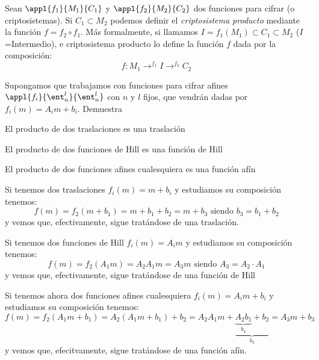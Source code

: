 \begin{problem}[10]
Sean $\appl{f_1}{M_1}{C_1}$ y $\appl{f_2}{M_2}{C_2}$ dos funciones para cifrar (o criptosistemas). Si $C_1 \subset M_2$ podemos definir el \textit{criptosistema producto} mediante la función $f = f_2 \circ f_1$. Más formalmente, si llamamos $I=f_1(M_1)\subset C_1 \subset M_2$ ($I$=Intermedio), e criptosistema producto lo define la función $f$ dada por la composición:
\[f:M_1 \to^{f_1} I \to^{f_2}C_2\]

Supongamos que trabajamos con funciones para cifrar afines $\appl{f_i}{\ent_n^l}{\ent_n^l}$ con $n$ y $l$ fijos, que vendrán dadas por $f_i(m)=A_im+b_i$. Demuestra

\ppart
El producto de dos traslaciones es una traslación

\ppart
El producto de dos funciones de Hill es una función de Hill

\ppart
El producto de dos funciones afines cualesquiera es una función afín

\solution
{}

\spart
Si tenemos dos traslaciones $f_i(m)=m+b_i$ y estudiamos su composición tenemos:
\[f(m)=f_2(m+b_1) = m+b_1+b_2 = m + b_3 \text{ siendo } b_3 = b_1+b_2\]
y vemos que, efectivamente, sigue tratándose de una traslación.

\spart
Si tenemos dos funciones de Hill $f_i(m)=A_im$ y estudiamos su composición tenemos:
\[f(m)=f_2(A_1m)=A_2A_1m = A_3m \text{ siendo } A_3 = A_2 \cdot A_1\]
y vemos que, efectivamente, sigue tratándose de una función de Hill

\spart
Si tenemos ahora dos funciones afines cualesquiera $f_i(m)=A_im+b_i$ y estudiamos su composición tenemos:
\[f(m)=f_2(A_1m+b_1)=A_2(A_1m+b_1)+b_2 = A_2A_1m + \underbrace{\underbrace{A_2b_1}_{b_4} + b_2}_{b_3} = A_3m + b_3\]
y vemos que, efecitvamente, sigue tratándose de una función afín.
\end{problem}

